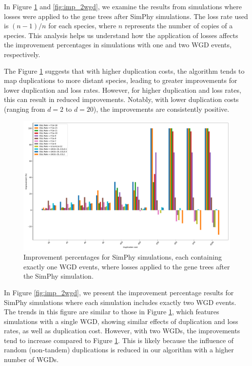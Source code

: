 \documentclass[10pt]{article}
\begin{document}
In Figure \ref{fig:imp_1wgd} and \ref{fig:imp_2wgd}, we examine the results from simulations where losses were applied to the gene trees after SimPhy simulations. The loss rate used is $(n-1)/n$ for each species, where $n$ represents the number of copies of a species. This analysis helps us understand how the application of losses affects the improvement percentages in simulations with one and two WGD events, respectively.

The Figure \ref{fig:imp_1wgd} suggests that with higher duplication costs, the algorithm tends to map duplications to more distant species, leading to greater improvements for lower duplication and loss rates. However, for higher duplication and loss rates, this can result in reduced improvements. Notably, with lower duplication costs (ranging from $d=2$ to $d=20$), the improvements are consistently positive.


\begin{figure}[hbt!]
    \centering
    \includegraphics[width=1\textwidth]{figs/imp_1WGD.pdf}
    \caption{Improvement percentages for SimPhy simulations, each containing exactly one WGD events, where losses applied to the gene trees after the SimPhy simulation.}
    \label{fig:imp_1wgd}
\end{figure}

In Figure \ref{fig:imp_2wgd}, we present the improvement percentage results for SimPhy simulations where each simulation includes exactly two WGD events. The trends in this figure are similar to those in Figure \ref{fig:imp_1wgd}, which features simulations with a single WGD, showing similar effects of duplication and loss rates, as well as duplication cost. However, with two WGDs, the improvements tend to increase compared to Figure \ref{fig:imp_1wgd}. This is likely because the influence of random (non-tandem) duplications is reduced in our algorithm with a higher number of WGDs.
\end{document}
